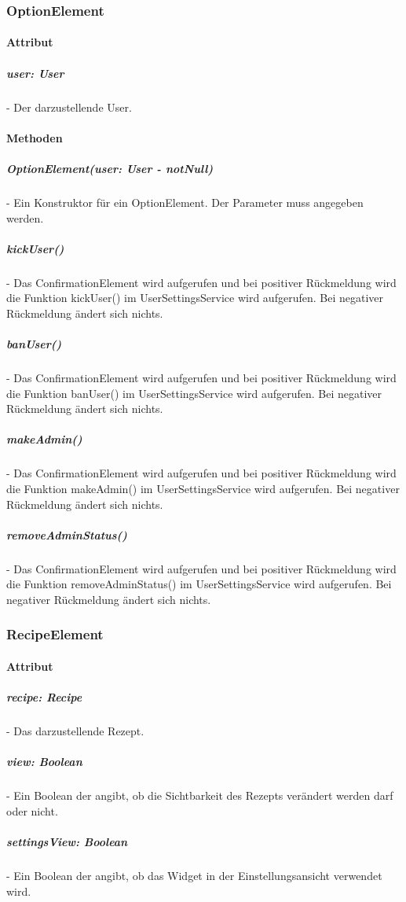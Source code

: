 \documentclass[parskip=full]{scrartcl}
\begin{document}
    \subsubsection{OptionElement}
        \paragraph*{Attribut}
            \subparagraph*{user: User} - Der darzustellende User.

        \paragraph*{Methoden}
            \subparagraph*{OptionElement(user: User - notNull)} - Ein Konstruktor für ein OptionElement. Der Parameter muss angegeben werden. 
            \subparagraph*{kickUser()} - Das ConfirmationElement wird aufgerufen und bei positiver Rückmeldung wird die Funktion kickUser() im UserSettingsService wird aufgerufen. Bei negativer Rückmeldung ändert sich nichts.
            \subparagraph*{banUser()} - Das ConfirmationElement wird aufgerufen und bei positiver Rückmeldung wird die Funktion banUser() im UserSettingsService wird aufgerufen. Bei negativer Rückmeldung ändert sich nichts.
            \subparagraph*{makeAdmin()} - Das ConfirmationElement wird aufgerufen und bei positiver Rückmeldung wird die Funktion makeAdmin() im UserSettingsService wird aufgerufen. Bei negativer Rückmeldung ändert sich nichts.
            \subparagraph*{removeAdminStatus()} - Das ConfirmationElement wird aufgerufen und bei positiver Rückmeldung wird die Funktion removeAdminStatus() im UserSettingsService wird aufgerufen. Bei negativer Rückmeldung ändert sich nichts.


    \subsubsection{RecipeElement} \label{sec:RecipeElement}
        \paragraph*{Attribut}
            \subparagraph*{recipe: Recipe} - Das darzustellende Rezept.
            \subparagraph*{view: Boolean} - Ein Boolean der angibt, ob die Sichtbarkeit des Rezepts verändert werden darf oder nicht.
            \subparagraph*{settingsView: Boolean} - Ein Boolean der angibt, ob das Widget in der Einstellungsansicht verwendet wird.
\end{document}
